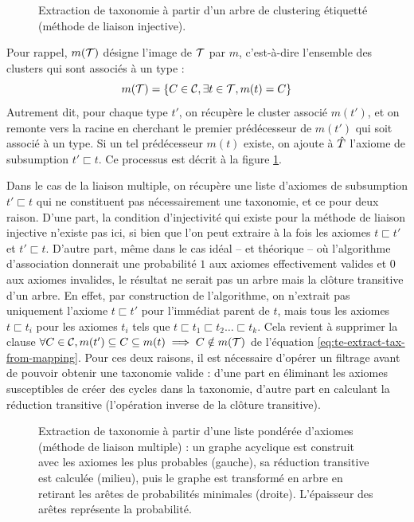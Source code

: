 \begin{figure}[h]
    \centering
    
    \caption[Extraction de taxonomie selon la méthode de liaison injective]{Extraction de taxonomie à partir d'un arbre de clustering étiquetté (méthode de liaison injective).}
    \label{fig:te-hm-extraction}
\end{figure}


Pour rappel, $m(\cal{T})$ désigne l'image de $\cal{T}$ par $m$, c'est-à-dire l'ensemble des clusters qui sont associés à un type :
\begin{equation}
    m(\cal{T}) = \{ C \in \cal{C}, \exists t \in \cal{T}, m(t) = C \}
\end{equation}
Autrement dit, pour chaque type $t'$, on récupère le cluster associé $m(t')$, et on remonte vers la racine en cherchant le premier prédécesseur de $m(t')$ qui soit associé à un type. Si un tel prédécesseur $m(t)$ existe, on ajoute à $\Tpred$ l'axiome de subsumption $t' \sqsubset t$. Ce processus est décrit à la figure \ref{fig:te-hm-extraction}.



Dans le cas de la liaison multiple, on récupère une liste d'axiomes de subsumption $t' \sqsubset t$ qui ne constituent pas nécessairement une taxonomie, et ce pour deux raison. D'une part, la condition d'injectivité qui existe pour la méthode de liaison injective n'existe pas ici, si bien que l'on peut extraire à la fois les axiomes $t \sqsubset t'$ et $t' \sqsubset t$. D'autre part, même dans le cas idéal – et théorique – où l'algorithme d'association donnerait une probabilité $1$ aux axiomes effectivement valides et $0$ aux axiomes invalides, le résultat ne serait pas un arbre mais la clôture transitive d'un arbre. En effet, par construction de l'algorithme, on n'extrait pas uniquement l'axiome $t \sqsubset t'$ pour l'immédiat parent de $t$, mais tous les axiomes $t \sqsubset t_i$ pour les axiomes $t_i$ tels que $t \sqsubset t_1 \sqsubset t_2 \ldots \sqsubset t_k$. Cela revient à supprimer la clause $\forall C \in \cal{C},  m(t') \subseteq C \subseteq m(t) \implies C \notin m(\cal{T})$ de l'équation \ref{eq:te-extract-tax-from-mapping}. Pour ces deux raisons, il est nécessaire d'opérer un filtrage avant de pouvoir obtenir une taxonomie valide : d'une part en éliminant les axiomes susceptibles de créer des cycles dans la taxonomie, d'autre part en calculant la réduction transitive (l'opération inverse de la clôture transitive).

\begin{figure}
    \centering
    
    \caption[Extraction de taxonomie à partir d'un graphe acyclique]{Extraction de taxonomie à partir d'une liste pondérée d'axiomes (méthode de liaison multiple) : un graphe acyclique est construit avec les axiomes les plus probables (gauche), sa réduction transitive est calculée (milieu), puis le graphe est transformé en arbre en retirant les arêtes de probabilités minimales (droite). L'épaisseur des arêtes représente la probabilité.}
    \label{fig:softmapping-extraction}
\end{figure}

